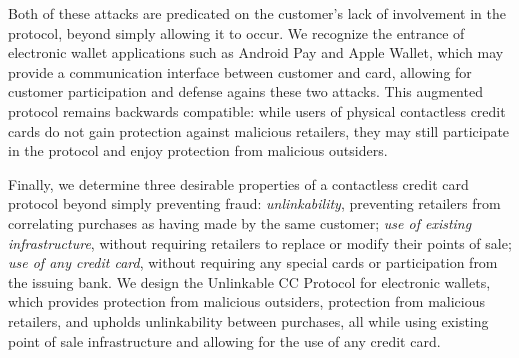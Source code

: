 Both of these attacks are predicated on the customer's lack of involvement in the protocol, beyond simply allowing it to occur.
We recognize the entrance of electronic wallet applications such as Android Pay and Apple Wallet, which may provide a communication interface between customer and card,
  allowing for customer participation and defense agains these two attacks.
This augmented protocol remains backwards compatible: while users of physical contactless credit cards do not gain protection against malicious retailers,
    they may still participate in the protocol and enjoy protection from malicious outsiders.

Finally, we determine three desirable properties of a contactless credit card protocol beyond simply preventing fraud:
    \emph{unlinkability}, preventing retailers from correlating purchases as having made by the same customer;
    \emph{use of existing infrastructure}, without requiring retailers to replace or modify their points of sale;
    \emph{use of any credit card}, without requiring any special cards or participation from the issuing bank.
We design the Unlinkable CC Protocol for electronic wallets, which provides
    protection from malicious outsiders,
    protection from malicious retailers,
    and upholds unlinkability between purchases,
    all while using existing point of sale infrastructure and allowing for the use of any credit card.
